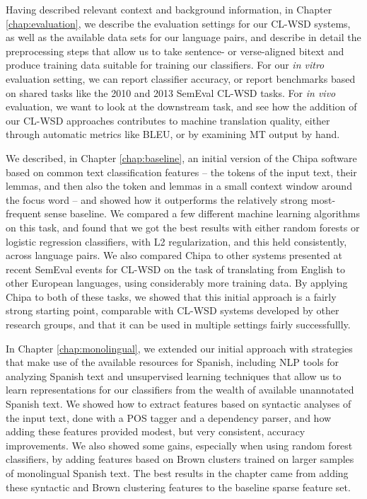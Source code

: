 Having described relevant context and background information, in Chapter
\ref{chap:evaluation}, we describe the evaluation settings for our CL-WSD
systems, as well as the available data sets for our language pairs, and
describe in detail the preprocessing steps that allow us to take sentence- or
verse-aligned bitext and produce training data suitable for training our
classifiers. For our \emph{in vitro} evaluation setting, we can report
classifier accuracy, or report benchmarks based on shared tasks like the 2010
and 2013 SemEval CL-WSD tasks. For \emph{in vivo} evaluation, we want to look
at the downstream task, and see how the addition of our CL-WSD approaches
contributes to machine translation quality, either through automatic metrics
like BLEU, or by examining MT output by hand.

We described, in Chapter \ref{chap:baseline}, an initial version of the Chipa
software based on common text classification features -- the tokens of the
input text, their lemmas, and then also the token and lemmas in a small context
window around the focus word -- and showed how it outperforms the relatively
strong most-frequent sense baseline. We compared a few different machine
learning algorithms on this task, and found that we got the best results with
either random forests or logistic regression classifiers, with L2
regularization, and this held consistently, across language pairs.
We also compared Chipa to other systems presented at recent SemEval events for
CL-WSD on the task of translating from English to other European languages,
using considerably more training data. By applying Chipa to both of these
tasks, we showed that this initial approach is a fairly strong starting point,
comparable with CL-WSD systems developed by other research groups, and that it
can be used in multiple settings fairly successfullly.

In Chapter \ref{chap:monolingual}, we extended our initial approach with
strategies that make use of the available resources for Spanish, including NLP
tools for analyzing Spanish text and unsupervised learning techniques that
allow us to learn representations for our classifiers from the wealth of
available unannotated Spanish text. We showed how to extract features based on
syntactic analyses of the input text, done with a POS tagger and a dependency
parser, and how adding these features provided modest, but very consistent,
accuracy improvements. We also showed some gains, especially when using random
forest classifiers, by adding features based on Brown clusters trained on
larger samples of monolingual Spanish text. The best results in the chapter
came from adding these syntactic and Brown clustering features to the baseline
sparse feature set.

